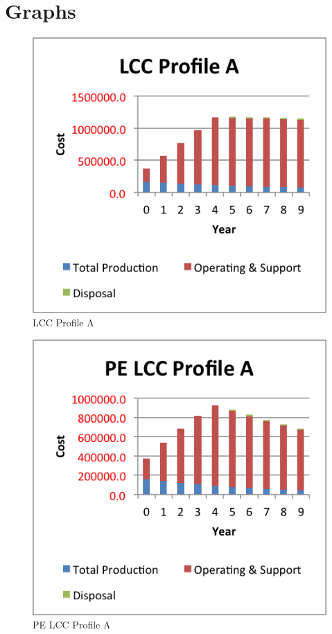 \documentclass[letterpaper,10pt]{article}
\begin{document}
\pagebreak
\section{Graphs}
\label{sec:graphs}

\begin{figure}[h!tbp]
	\begin{center}
		\includegraphics[scale=0.95]{images/LCCProfileA.png}
	\end{center}
	\caption{LCC Profile A}
	\label{fig:lccprofilea}
\end{figure}

\begin{figure}[h!tbp]
	\begin{center}
		\includegraphics[scale=0.95]{images/PELCCProfileA.png}
	\end{center}
	\caption{PE LCC Profile A}
	\label{fig:pelccprofilea}
\end{figure}
\end{document}
